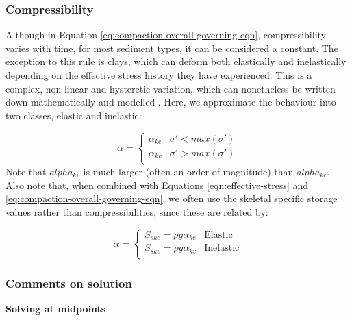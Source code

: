 \documentclass{article}
\begin{document}
\subsubsection{Compressibility}

Although in Equation \ref{eq:compaction-overall-governing-eqn}, compressibility varies with time, for most sediment types, it can be considered a constant. The exception to this rule is clays, which can deform both elastically and inelastically depending on the effective stress history they have experienced. This is a complex, non-linear and hysteretic variation, which can nonetheless be written down mathematically and modelled \cite{helm_one-dimensional_1976}. Here, we approximate the behaviour into two classes, elastic and inelastic:

\begin{equation}
\label{eq:compressibility-clays}
\alpha = 
\begin{cases}
\alpha_{ke} & \sigma' < max(\sigma') \\
\alpha_{kv} & \sigma' > max(\sigma') \\
\end{cases}
\end{equation}
Note that $alpha_{kv}$ is much larger (often an order of magnitude) than $alpha_{ke}$. Also note that, when combined with Equations \ref{eqn:effective-stress} and \ref{eq:compaction-overall-governing-eqn}, we often use the skeletal specific storage values rather than compressibilities, since these are related by:

\begin{equation}
\label{eq:skeletal-specific-storage}
\alpha = 
\begin{cases}
S_{ske} = \rho g \alpha_{ke} & \text{Elastic} \\
S_{skv} = \rho g \alpha_{kv} & \text{Inelastic} \\
\end{cases}
\end{equation}

\subsubsection{Comments on solution}
\label{sec:Convergence-compaction}

\textbf{Solving at midpoints}
\end{document}

